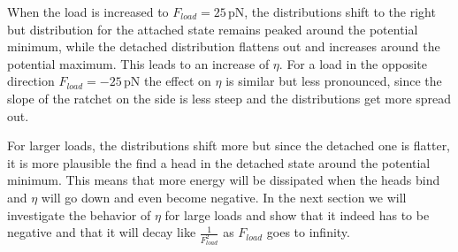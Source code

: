 \documentclass[aps,pre,twocolumn,showpacs,showkeys,a4paper]{revtex4}
\begin{document}
When the load is increased to $F_{load} = 25 \, \mathrm{pN}$, the distributions shift to the right but distribution for the attached state remains peaked around the potential minimum, while the detached distribution flattens out and increases around the potential maximum. 
This leads to an increase of $\eta$. 
For a load in the opposite direction $F_{load}= -25 \, \mathrm{pN}$ the effect on $\eta$ is similar but less pronounced, since the slope of the ratchet on the side is less steep and the distributions get more spread out. 


For larger loads, the distributions shift more but since the detached one is flatter, it is more plausible the find a head in the detached state around the potential minimum. 
This means that more energy will be dissipated when the heads bind and $\eta$ will go down and even become negative. 
In the next section we will investigate the behavior of $\eta$ for large loads and show that it indeed has to be negative and that it will decay like $\frac{1}{F_{load}^2}$ as $F_{load}$ goes to infinity.
\end{document}
